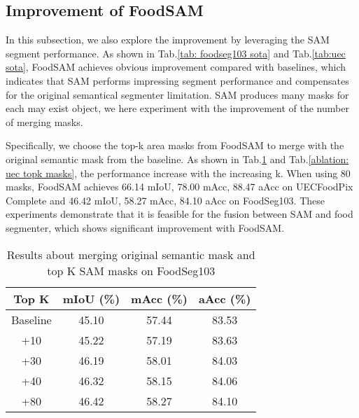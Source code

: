 \documentclass[lettersize,journal]{IEEEtran}
\begin{document}
\subsection{Improvement of FoodSAM}
In this subsection, we also explore the improvement by leveraging the SAM segment performance. 
As shown in Tab.\ref{tab: foodseg103 sota} and Tab.\ref{tab:uec sota}, FoodSAM achieves obvious improvement compared with baselines, which indicates that SAM performs impressing segment performance and compensates for the original semantical segmenter limitation.
SAM produces many masks for each may exist object, we here experiment with the improvement of the number of merging masks.

Specifically, we choose the top-k area masks from FoodSAM to merge with the original semantic mask from the baseline. 
As shown in Tab.\ref{ablation: topk masks} and Tab.\ref{ablation: uec topk masks}, the performance increase with the increasing k.
When using 80 masks, FoodSAM achieves 66.14 mIoU, 78.00 mAcc, 88.47 aAcc on UECFoodPix Complete and 46.42 mIoU, 58.27 mAcc, 84.10 aAcc on FoodSeg103.
These experiments demonstrate that it is feasible for the fusion between SAM and food segmenter, which shows significant improvement with FoodSAM. 

\begin{table}
\centering
\caption{Results about merging original semantic mask and top K SAM masks on FoodSeg103}
\begin{tabular}{c|ccc}
\hline
\textbf{Top K}             & \textbf{mIoU (\%)} & \textbf{mAcc (\%)} & \textbf{aAcc (\%)} \\ \hline

Baseline   & 45.10         & 57.44         & 83.53         \\
+10 & 45.22         & 57.19         & 83.63         \\
+30 & 46.19         & 58.01         & 84.03 \\
+40 & 46.32         & 58.15         & 84.06         \\
+80 & 46.42         & 58.27         & 84.10         \\ \hline
\end{tabular}
\captionsetup{justification=centering}
\label{ablation: topk masks}
\end{table}
 
\end{document}
